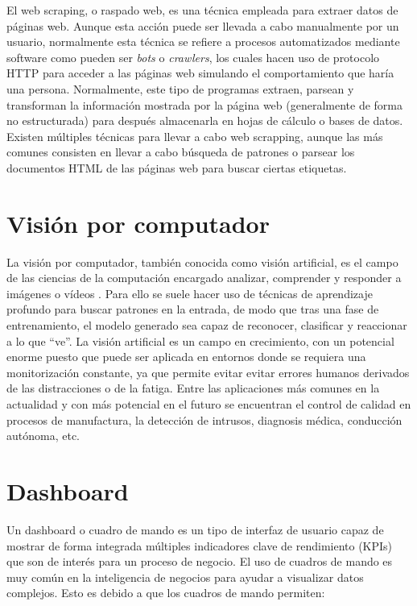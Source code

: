 El web scraping, o raspado web, es una técnica empleada para extraer datos de páginas web. Aunque esta acción puede ser llevada a cabo manualmente por un usuario, normalmente esta técnica se refiere a procesos automatizados mediante software como pueden ser \textit{bots} o \textit{crawlers}, los cuales hacen uso de protocolo HTTP para acceder a las páginas web simulando el comportamiento que haría una persona. Normalmente, este tipo de programas extraen, parsean y transforman la información mostrada por la página web (generalmente de forma no estructurada) para después almacenarla en hojas de cálculo o bases de datos. Existen múltiples técnicas para llevar a cabo web scrapping, aunque las más comunes consisten en llevar a cabo búsqueda de patrones o parsear los documentos HTML de las páginas web para buscar ciertas etiquetas.

\section{Visión por computador}

La visión por computador, también conocida como visión artificial, es el campo de las ciencias de la computación encargado analizar, comprender y responder a imágenes o vídeos \cite{insight_cv}. Para ello se suele hacer uso de técnicas de aprendizaje profundo para buscar patrones en la entrada, de modo que tras una fase de entrenamiento, el modelo generado sea capaz de reconocer, clasificar y reaccionar a lo que ``ve''. La visión artificial es un campo en crecimiento, con un potencial enorme puesto que puede ser aplicada en entornos donde se requiera una monitorización constante, ya que permite evitar evitar errores humanos derivados de las distracciones o de la fatiga. Entre las aplicaciones más comunes en la actualidad y con más potencial en el futuro se encuentran el control de calidad en procesos de manufactura, la detección de intrusos, diagnosis médica, conducción autónoma, etc.

\section{Dashboard}

Un dashboard o cuadro de mando es un tipo de interfaz de usuario capaz de mostrar de forma integrada múltiples indicadores clave de rendimiento (KPIs) que son de interés para un proceso de negocio. El uso de cuadros de mando es muy común en la inteligencia de negocios para ayudar a visualizar datos complejos. Esto es debido a que los cuadros de mando permiten:

